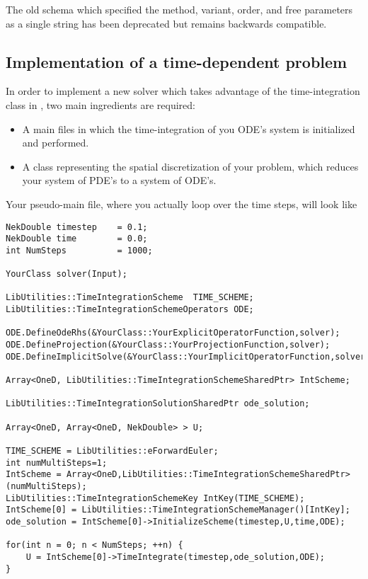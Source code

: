 The old schema which specified the method, variant, order, and free
parameters as a single string has been deprecated but remains
backwards compatible.


\subsection{Implementation of a time-dependent problem}
In order to implement a new solver which takes advantage of the
time-integration class in {\nek}, two main ingredients are required:
\begin{itemize}
\item A main files in which the time-integration of you ODE's system is
initialized and performed.
\item A class representing the spatial discretization of your problem, which
reduces your system of PDE's to a system of ODE's.
\end{itemize}

Your pseudo-main file, where you actually loop over the time steps, will look
like
\begin{lstlisting}[style=C++Style]
NekDouble timestep    = 0.1; 
NekDouble time        = 0.0; 
int NumSteps          = 1000;

YourClass solver(Input);
    
LibUtilities::TimeIntegrationScheme  TIME_SCHEME;
LibUtilities::TimeIntegrationSchemeOperators ODE;

ODE.DefineOdeRhs(&YourClass::YourExplicitOperatorFunction,solver);
ODE.DefineProjection(&YourClass::YourProjectionFunction,solver);
ODE.DefineImplicitSolve(&YourClass::YourImplicitOperatorFunction,solver);
    
Array<OneD, LibUtilities::TimeIntegrationSchemeSharedPtr> IntScheme;
    
LibUtilities::TimeIntegrationSolutionSharedPtr ode_solution;
    
Array<OneD, Array<OneD, NekDouble> > U;

TIME_SCHEME = LibUtilities::eForwardEuler; 
int numMultiSteps=1; 
IntScheme = Array<OneD,LibUtilities::TimeIntegrationSchemeSharedPtr>(numMultiSteps); 
LibUtilities::TimeIntegrationSchemeKey IntKey(TIME_SCHEME); 
IntScheme[0] = LibUtilities::TimeIntegrationSchemeManager()[IntKey]; 
ode_solution = IntScheme[0]->InitializeScheme(timestep,U,time,ODE);

for(int n = 0; n < NumSteps; ++n) {
    U = IntScheme[0]->TimeIntegrate(timestep,ode_solution,ODE);
}
\end{lstlisting}

